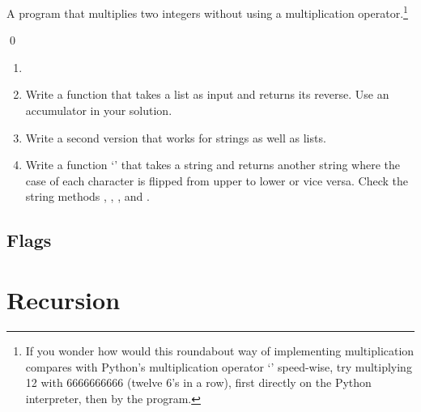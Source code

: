 \documentclass[a4paper]{article}
\begin{document}
{\begin{itemize}
\begin{ucode}[Multiplication]
A program that multiplies two integers without using a multiplication
operator.\footnote{If you wonder how would this roundabout way of implementing multiplication
compares with Python's multiplication operator `\pyv{*}' speed-wise, try
multiplying 12 with 6666666666 (twelve 6's in a row), first directly on the
Python interpreter, then by the program.}

\begin{ucodeframe}
\end{ucodeframe}
\qed
\end{ucode}

\begin{uexercise}[Accumulators]
\begin{enumerate}
\item[]
\item
Write a function that takes a list as input and returns its reverse. Use
an accumulator in your solution.
\item
Write a second version that works for strings as well as lists.
\item Write a function `' that takes a string and returns another
string where the case of each character is flipped from upper to lower or vice
versa. Check the string methods , , ,
and
.
\end{enumerate}
\end{uexercise}


\end{itemize}


\subsection{Flags} 

% 
% 
% 

\section{Recursion}

\begin{itemize}


\end{itemize}}
\end{document}
